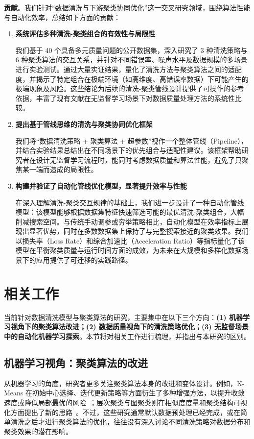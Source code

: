 \documentclass[8pt]{article} %
\numberwithin{equation}{section}
\begin{document}
\textbf{贡献}。我们针对“数据清洗与下游聚类协同优化”这一交叉研究领域，围绕算法性能与自动化效率，总结如下方面的贡献：
\begin{enumerate}
    \item \textbf{系统评估多种清洗-聚类组合的有效性与局限性}  

    我们基于 40 个具备多元质量问题的公开数据集，深入研究了 3 种清洗策略与 6 种聚类算法的交互关系，并针对不同错误率、噪声水平及数据规模的多场景进行实验测试。通过大量实证结果，量化了清洗方法与聚类算法之间的适配度，并揭示了特定组合在极端环境（如高维度、高错误率数据）下可能产生的极端现象及风险。这些结论为后续的清洗-聚类管线设计提供了可操作的参考依据，丰富了现有文献在无监督学习场景下对数据质量处理方法的系统性比较。

    \item \textbf{提出基于管线思维的清洗与聚类协同优化框架}  

    我们将“数据清洗策略 + 聚类算法 + 超参数”视作一个整体管线（Pipeline），并结合实验结果总结出在不同场景下的优先组合与适配性建议。该框架帮助研究者在设计无监督学习流程时，能同时考虑数据质量和算法性能，避免了只聚焦某一端而造成的局限性。

    \item \textbf{构建并验证了自动化管线优化模型，显著提升效率与性能}  

    在深入理解清洗-聚类交互规律的基础上，我们进一步设计了一种自动化管线模型：该模型能够根据数据集特征快速筛选可能的最优清洗-聚类组合，大幅削减搜索空间。与传统手动调参或穷举策略相比，自动化模型在效率指标上展现出显著优势，同时在多数数据集上保持了与完整搜索接近的聚类效果。我们以损失率（Loss Rate）和综合加速比（Acceleration Ratio）等指标量化了该模型在平衡聚类质量与运行时间方面的成效，为未来在大规模和多样化数据场景下的应用提供了可迁移的实践路径。

\end{enumerate}

\section{相关工作}\label{sec:related_work}

当前针对数据清洗模型与聚类算法的研究，主要集中在以下三个方向：\textbf{(1) 机器学习视角下的聚类算法改进；(2) 数据质量视角下的清洗策略优化；(3) 无监督场景中的自动化机器学习探索}。本节将对相关工作进行梳理，并指出与本研究的区别。

\subsection{机器学习视角：聚类算法的改进}
从机器学习的角度，研究者更多关注聚类算法本身的改进和变体设计。例如，K-Means 在初始中心选择、迭代更新策略等方面衍生了多种增强方法，以提升收敛速度或降低局部最优的风险~\cite{ref8, ref9}；层次聚类与图聚类则在相似度度量和聚类结构可视化方面提出了新的思路~\cite{ref10}。不过，这些研究通常默认数据预处理已经完成，或在简单清洗之后才进行聚类算法的优化，往往没有深入讨论不同清洗策略对数据分布和聚类效果的潜在影响。
\end{document}

